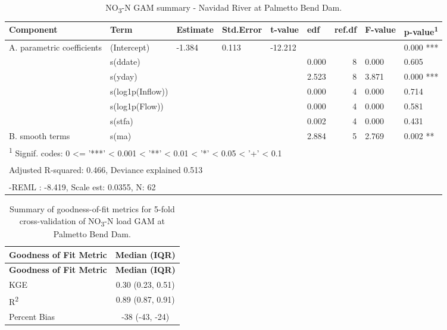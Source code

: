\documentclass[
]{article}
\newenvironment{widestuff}{\begin{table}[h]\begin{adjustwidth}{-4.5cm}{-4.5cm}\centering}{\end{adjustwidth}\end{table}}
\begin{document}
\begin{widestuff}

\caption{NO\textsubscript{3}-N GAM summary - Navidad River at Palmetto Bend Dam.}
\centering
\begin{tabular}[t]{llllllrll}
\toprule
Component & Term & Estimate & Std.Error & t-value & edf & ref.df & F-value & p-value\textsuperscript{1}\\
\midrule
A. parametric coefficients & (Intercept) & -1.384 & 0.113 & -12.212 &  &  &  & 0.000 ***\\
\cmidrule{1-9}
 & s(ddate) &  &  &  & 0.000 & 8 & 0.000 & 0.605\\

 & s(yday) &  &  &  & 2.523 & 8 & 3.871 & 0.000 ***\\

 & s(log1p(Inflow)) &  &  &  & 0.000 & 4 & 0.000 & 0.714\\

 & s(log1p(Flow)) &  &  &  & 0.000 & 4 & 0.000 & 0.581\\

 & s(stfa) &  &  &  & 0.002 & 4 & 0.000 & 0.431\\

\multirow[t]{-6}{*}{\raggedright\arraybackslash B. smooth terms} & s(ma) &  &  &  & 2.884 & 5 & 2.769 & 0.002 **\\
\bottomrule
\multicolumn{9}{l}{\textsuperscript{1} Signif. codes: 0 <= '***' < 0.001 < '**' < 0.01 < '*' < 0.05 < '+' < 0.1}\\
\multicolumn{9}{l}{\textsuperscript{} Adjusted R-squared: 0.466, Deviance explained 0.513}\\
\multicolumn{9}{l}{\textsuperscript{} -REML : -8.419, Scale est: 0.0355, N: 62}\\
\end{tabular}
\end{widestuff}

\hypertarget{tbl-NO3PalmettoBend-CV}{}
\begin{longtable}[]{@{}lc@{}}
\caption{\label{tbl-NO3PalmettoBend-CV}Summary of goodness-of-fit
metrics for 5-fold cross-validation of NO\textsubscript{3}-N load GAM at
Palmetto Bend Dam.}\tabularnewline
\toprule()
\textbf{Goodness of Fit Metric} & \textbf{Median (IQR)} \\
\midrule()
\endfirsthead
\toprule()
\textbf{Goodness of Fit Metric} & \textbf{Median (IQR)} \\
\midrule()
\endhead
KGE & 0.30 (0.23, 0.51) \\
R\textsuperscript{2} & 0.89 (0.87, 0.91) \\
Percent Bias & -38 (-43, -24) \\
\bottomrule()
\end{longtable}
\end{document}
